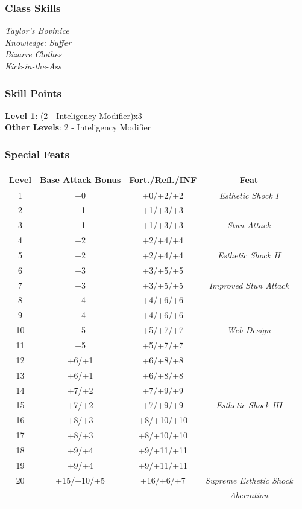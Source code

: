 \documentclass[ letterpaper,12pt]{article}
\begin{document}
\subsubsection{Class Skills}
{\it
Taylor's Bovinice\\
Knowledge: Suffer\\
Bizarre Clothes\\
Kick-in-the-Ass\\}

\subsubsection{Skill Points}
{\bf Level 1}: (2 - Inteligency Modifier)x3\\
{\bf Other Levels}: 2 - Inteligency Modifier\\

\subsubsection{Special Feats}

\begin{center} \begin{tabular}{|c||c|c|c|}
\hline
{\bf Level}&{\bf Base Attack Bonus}&{\bf Fort./Refl./INF}&{\bf Feat}\\
\hline
1&+0&+0/+2/+2&{\it Esthetic Shock I}\\
\hline
2&+1&+1/+3/+3&\\
\hline
3&+1&+1/+3/+3&{\it Stun Attack}\\
\hline
4&+2&+2/+4/+4&\\
\hline
5&+2&+2/+4/+4&{\it Esthetic Shock II}\\
\hline
6&+3&+3/+5/+5&\\
\hline
7&+3&+3/+5/+5&{\it Improved Stun Attack}\\
\hline
8&+4&+4/+6/+6&\\
\hline
9&+4&+4/+6/+6&\\
\hline
10&+5&+5/+7/+7&{\it Web-Design}\\
\hline
11&+5&+5/+7/+7&\\
\hline
12&+6/+1&+6/+8/+8&\\
\hline
13&+6/+1&+6/+8/+8&\\
\hline
14&+7/+2&+7/+9/+9&\\
\hline
15&+7/+2&+7/+9/+9&{\it Esthetic Shock III }\\
\hline
16&+8/+3&+8/+10/+10&\\
\hline
17&+8/+3&+8/+10/+10&\\
\hline
18&+9/+4&+9/+11/+11&\\
\hline
19&+9/+4&+9/+11/+11&\\
\hline
20&+15/+10/+5&+16/+6/+7&{\it Supreme Esthetic Shock}\\
&&&{\it Aberration}\\
\hline
\end{tabular} \end{center}
\end{document}
